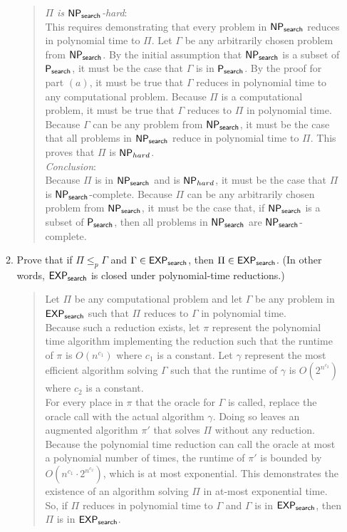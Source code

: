 \documentclass[11pt]{article}
\begin{document}
\begin{enumerate}
\begin{enumerate}
\begin{quote}
            \textit{$\Pi$ is $\mathsf{NP_{search}}$-hard}: \\
            This requires demonstrating that every problem in $\mathsf{NP_{search}}$ reduces in polynomial time to $\Pi$. Let $\Gamma$ be any arbitrarily chosen problem from $\mathsf{NP_{search}}$. By the initial assumption that $\mathsf{NP_{search}}$ is a subset of $\mathsf{P_{search}}$, it must be the case that $\Gamma$ is in $\mathsf{P_{search}}$. By the proof for part $(a)$, it must be true that $\Gamma$ reduces in polynomial time to any computational problem. Because $\Pi$ is a computational problem, it must be true that $\Gamma$ reduces to $\Pi$ in polynomial time. Because $\Gamma$ can be any problem from $\mathsf{NP_{search}}$, it must be the case that all problems in $\mathsf{NP_{search}}$ reduce in polynomial time to $\Pi$. This proves that $\Pi$ is $\mathsf{NP}_{hard}$. \\

            \textit{Conclusion}: \\
            Because $\Pi$ is in $\mathsf{NP_{search}}$ and is $\mathsf{NP}_{hard}$, it must be the case that $\Pi$ is $\mathsf{NP_{search}}$-complete. Because $\Pi$ can be any arbitrarily chosen problem from $\mathsf{NP_{search}}$, it must be the case that, if $\mathsf{NP_{search}}$ is a subset of $\mathsf{P_{search}}$, then all problems in $\mathsf{NP_{search}}$ are $\mathsf{NP_{search}}$-complete. \\ 
            
        \end{quote}
        
        \item  Prove that if 
$\Pi\leq_p \Gamma$ and $\Gamma\in \mathsf{EXP_{search}}$, then $\Pi\in \mathsf{EXP_{search}}$. (In other words, $\mathsf{EXP_{search}}$ is closed under polynomial-time reductions.) 

\begin{quote}
    \color{purple}
    Let $\Pi$ be any computational problem and let $\Gamma$ be any problem in $\mathsf{EXP_{search}}$ such that $\Pi$ reduces to $\Gamma$ in polynomial time. \\

    Because such a reduction exists, let $\pi$ represent the polynomial time algorithm implementing the reduction such that the runtime of $\pi$ is $O(n^{c_1})$ where $c_1$ is a constant. Let $\gamma$ represent the most efficient algorithm solving $\Gamma$ such that the runtime of $\gamma$ is $O(2^{n^{c_2}})$ where $c_2$ is a constant. \\

    For every place in $\pi$ that the oracle for $\Gamma$ is called, replace the oracle call with the actual algorithm $\gamma$. Doing so leaves an augmented algorithm $\pi'$ that solves $\Pi$ without any reduction. Because the polynomial time reduction can call the oracle at most a polynomial number of times, the runtime of $\pi'$ is bounded by $O(n^{c_1} \cdot 2^{n^{c_2}})$, which is at most exponential. This demonstrates the existence of an algorithm solving $\Pi$ in at-most exponential time. So, if $\Pi$ reduces in polynomial time to $\Gamma$ and $\Gamma$ is in $\mathsf{EXP_{search}}$, then $\Pi$ is in $\mathsf{EXP_{search}}$. \\
    

\end{quote}
\end{enumerate}
\end{enumerate}
\end{document}
